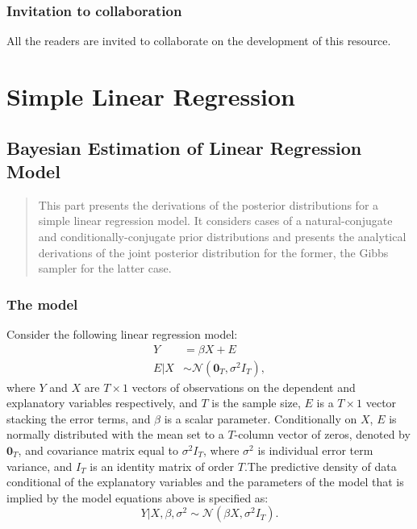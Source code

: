 \documentclass[
  letterpaper,
  DIV=11,
  numbers=noendperiod]{scrreprt}
\begin{document}
\hypertarget{invitation-to-collaboration}{%
\section*{Invitation to
collaboration}\label{invitation-to-collaboration}}

All the readers are invited to collaborate on the development of this
resource.

\part{Simple Linear Regression}

\hypertarget{bayesian-estimation-of-linear-regression-model}{%
\chapter{Bayesian Estimation of Linear Regression
Model}\label{bayesian-estimation-of-linear-regression-model}}

\begin{quote}
This part presents the derivations of the posterior distributions for a
simple linear regression model. It considers cases of a
natural-conjugate and conditionally-conjugate prior distributions and
presents the analytical derivations of the joint posterior distribution
for the former, the Gibbs sampler for the latter case.
\end{quote}

\hypertarget{the-model}{%
\section{The model}\label{the-model}}

Consider the following linear regression model: \begin{align} 
Y &= \beta X + E\\
E|X &\sim\mathcal{N}\left(\mathbf{0}_T, \sigma^2I_T\right),
\end{align} where \(Y\) and \(X\) are \(T\times1\) vectors of
observations on the dependent and explanatory variables respectively,
and \(T\) is the sample size, \(E\) is a \(T\times1\) vector stacking
the error terms, and \(\beta\) is a scalar parameter. Conditionally on
\(X\), \(E\) is normally distributed with the mean set to a \(T\)-column
vector of zeros, denoted by \(\mathbf{0}_T\), and covariance matrix
equal to \(\sigma^2I_T\), where \(\sigma^2\) is individual error term
variance, and \(I_T\) is an identity matrix of order \(T\).The
predictive density of data conditional of the explanatory variables and
the parameters of the model that is implied by the model equations above
is specified as: \begin{equation} 
Y|X,\beta,\sigma^2 \sim\mathcal{N}\left(\beta X, \sigma^2I_T\right).
\end{equation}
\end{document}
